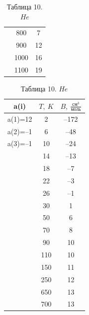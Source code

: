 \documentclass[a4paper]{article}
\numberwithin{equation}{subsection} %
\begin{document}
\begin{table}[ht!]
\begin{minipage}{0.32\linewidth}
\begin{tabular}{|c|c|c|}
          & 800 & 7 \\
          & 900 & 12 \\
          & 1000 & 16 \\
          & 1100 & 19 \\
\hline
\end{tabular}
\caption{Таблица 9. $CO_2$}
\label{tab:co2}
\end{minipage}
\hfill
\begin{minipage}{0.32\linewidth}
\centering
\begin{tabular}{|c|c|c|}
\hline
a(i) & $T,\ K$ & $B,\ \frac{\text{см}^3}{\text{моль}}$ \\
\hline
a(1)=12 & 2 & –172 \\
a(2)=–1 & 6 & –48 \\
a(3)=–1 & 10 & –24 \\
        & 14 & –13 \\
        & 18 & –7 \\
        & 22 & –3 \\
        & 26 & –1 \\
        & 30 & 1 \\
        & 50 & 6 \\
        & 70 & 8 \\
        & 90 & 10 \\
        & 110 & 10 \\
        & 150 & 11 \\
        & 250 & 12 \\
        & 650 & 13 \\
        & 700 & 13 \\
\hline
\end{tabular}
\caption{Таблица 10. $He$}
\label{tab:he}
\end{minipage}
\end{table}
\end{document}
